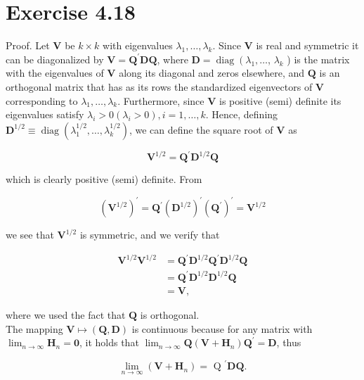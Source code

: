 \documentclass[10pt]{article}
\begin{document}
\section*{Exercise 4.18}
Proof. Let $\mathbf{V}$ be $k \times k$ with eigenvalues $\lambda_{1}, \ldots, \lambda_{k}$. Since $\mathbf{V}$ is real and symmetric it can be diagonalized by $\mathbf{V}=\mathbf{Q}^{\prime} \mathbf{D Q}$, where $\mathbf{D}=\operatorname{diag}\left(\lambda_{1}, \ldots\right.$, $\lambda_{k}$ ) is the matrix with the eigenvalues of $\mathbf{V}$ along its diagonal and zeros elsewhere, and $\mathbf{Q}$ is an orthogonal matrix that has as its rows the standardized eigenvectors of $\mathbf{V}$ corresponding to $\lambda_{1}, \ldots, \lambda_{k}$. Furthermore, since $\mathbf{V}$ is positive (semi) definite its eigenvalues satisfy $\lambda_{i}>0\left(\lambda_{i}>0\right), i=1, \ldots, k$. Hence, defining $\mathbf{D}^{1 / 2} \equiv \operatorname{diag}\left(\lambda_{1}^{1 / 2}, \ldots, \lambda_{k}^{1 / 2}\right)$, we can define the square root of $\mathbf{V}$ as

$$
\mathbf{V}^{1 / 2}=\mathbf{Q}^{\prime} \mathbf{D}^{1 / 2} \mathbf{Q}
$$

which is clearly positive (semi) definite. From

$$
\left(\mathbf{V}^{1 / 2}\right)^{\prime}=\mathbf{Q}^{\prime}\left(\mathbf{D}^{1 / 2}\right)^{\prime}\left(\mathbf{Q}^{\prime}\right)^{\prime}=\mathbf{V}^{1 / 2}
$$

we see that $\mathbf{V}^{1 / 2}$ is symmetric, and we verify that

$$
\begin{aligned}
\mathbf{V}^{1 / 2} \mathbf{V}^{1 / 2} & =\mathbf{Q}^{\prime} \mathbf{D}^{1 / 2} \mathbf{Q}^{\prime} \mathbf{D}^{1 / 2} \mathbf{Q} \\
& =\mathbf{Q}^{\prime} \mathbf{D}^{1 / 2} \mathbf{D}^{1 / 2} \mathbf{Q} \\
& =\mathbf{V},
\end{aligned}
$$

where we used the fact that $\mathbf{Q}$ is orthogonal.\\
The mapping $\mathbf{V} \longmapsto(\mathbf{Q}, \mathbf{D})$ is continuous because for any matrix with $\lim _{n \rightarrow \infty} \mathbf{H}_{n}=\mathbf{0}$, it holds that $\lim _{n \rightarrow \infty} \mathbf{Q}\left(\mathbf{V}+\mathbf{H}_{n}\right) \mathbf{Q}^{\prime}=\mathbf{D}$, thus

$$
\lim _{n \rightarrow \infty}\left(\mathbf{V}+\mathbf{H}_{n}\right)=\text { Q }^{\prime} \mathbf{D Q} .
$$
\end{document}
